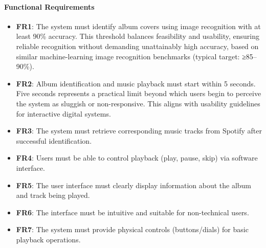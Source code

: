             \paragraph{Functional Requirements}
                \begin{itemize}
                    \item \textbf{FR1}: The system must identify album covers using image recognition with at least 90\% accuracy. This threshold balances feasibility and usability, ensuring reliable recognition without demanding unattainably high accuracy, based on similar machine-learning image recognition benchmarks (typical target: ≥85–90\%).
                    \item \textbf{FR2}: Album identification and music playback must start within 5 seconds. Five seconds represents a practical limit beyond which users begin to perceive the system as sluggish or non-responsive. This aligns with usability guidelines for interactive digital systems.
                    \item \textbf{FR3}: The system must retrieve corresponding music tracks from Spotify after successful identification.
                    \item \textbf{FR4}: Users must be able to control playback (play, pause, skip) via software interface.
                    \item \textbf{FR5}: The user interface must clearly display information about the album and track being played.
                    \item \textbf{FR6}: The interface must be intuitive and suitable for non-technical users.
                    \item \textbf{FR7}: The system must provide physical controls (buttons/dials) for basic playback operations.
                \end{itemize}
            
